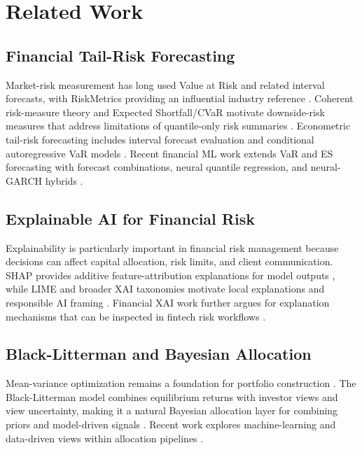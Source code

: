 \documentclass{ieeeaccess}
\begin{document}
\section{Related Work}
\label{sec:related}

\subsection{Financial Tail-Risk Forecasting}
Market-risk measurement has long used Value at Risk and related interval forecasts, with RiskMetrics providing an influential industry reference \cite{JPMorganReuters1996RiskMetricsTechnicalDocument}. Coherent risk-measure theory and Expected Shortfall/CVaR motivate downside-risk measures that address limitations of quantile-only risk summaries \cite{ArtznerEtAl1999CoherentRisk,RockafellarUryasev2000CVaR,AcerbiTasche2002ExpectedShortfall}. Econometric tail-risk forecasting includes interval forecast evaluation and conditional autoregressive VaR models \cite{Christoffersen1998IntervalForecasts,EngleManganelli2004CAViaR}. Recent financial ML work extends VaR and ES forecasting with forecast combinations, neural quantile regression, and neural-GARCH hybrids \cite{Taylor2020ForecastCombinationsVaRES,ChronopoulosEtAl2023DeepVaR,BuczynskiChlebus2023GARCHNet}.

\subsection{Explainable AI for Financial Risk}
Explainability is particularly important in financial risk management because decisions can affect capital allocation, risk limits, and client communication. SHAP provides additive feature-attribution explanations for model outputs \cite{LundbergLee2017SHAP}, while LIME and broader XAI taxonomies motivate local explanations and responsible AI framing \cite{RibeiroSinghGuestrin2016LIME,BarredoArrietaEtAl2020XAI}. Financial XAI work further argues for explanation mechanisms that can be inspected in fintech risk workflows \cite{BussmannEtAl2020XAIFintechRisk}.

\subsection{Black-Litterman and Bayesian Allocation}
Mean-variance optimization remains a foundation for portfolio construction \cite{Markowitz1952PortfolioSelection}. The Black-Litterman model combines equilibrium returns with investor views and view uncertainty, making it a natural Bayesian allocation layer for combining priors and model-driven signals \cite{BlackLitterman1992GlobalPortfolioOptimization,SatchellScowcroft2000BlackLittermanDemystification,Meucci2008BlackLittermanExtensions}. Recent work explores machine-learning and data-driven views within allocation pipelines \cite{BanElKarouiLim2018MLPortfolioOptimization,LiEtAl2022IntelligentBlackLitterman,BaruaSharma2022DynamicBlackLittermanMLViews,BaruaSharma2023FearGreedMLBlackLitterman}.
\end{document}
